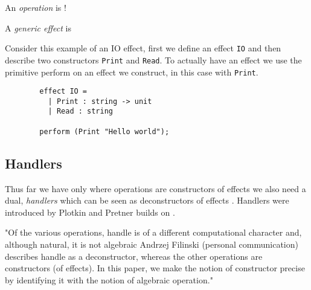 \begin{definition}
    An \textit{operation} is !
\end{definition}

\begin{definition}
    A \textit{generic effect} is
\end{definition}

\begin{example}
    Consider this example of an IO effect,
    first we define an effect \texttt{IO}
    and then describe two constructors
    \texttt{Print} and \texttt{Read}.
    To actually have an effect we use the primitive
    perform on an effect we construct, in this case with \texttt{Print}.
    \begin{verbatim}
        effect IO =
          | Print : string -> unit
          | Read : string

        perform (Print "Hello world");
    \end{verbatim}
\end{example}

\subsection{Handlers}
Thus far we have only
where operations are constructors of effects
we also need a dual,
\textit{handlers} which can be seen as deconstructors of effects
\cite{}.
Handlers were introduced by Plotkin and Pretner\cite{Plotkin:2009dr}
builds on
\cite{benton2001exceptional}
.

"Of the various operations, handle is of a different computational character and, although natural, it is not algebraic
Andrzej Filinski (personal communication) describes handle as a deconstructor, whereas the other operations are constructors (of effects). In this paper, we make the notion of constructor precise by identifying it with the notion of algebraic operation."
\cite{Plotkin:2002dw}

